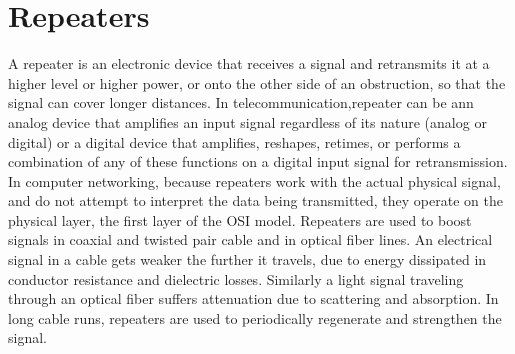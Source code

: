 \section{Repeaters}
A repeater is an electronic device that receives a signal and retransmits it at a higher level or higher power, or onto the other side of an obstruction, so that the signal can cover longer distances.
In telecommunication,repeater can be ann analog device that amplifies an input signal regardless of its nature (analog or digital) or a digital device that amplifies, reshapes, retimes, or performs a combination of any of these functions on a digital input signal for retransmission.
In computer networking, because repeaters work with the actual physical signal, and do not attempt to interpret the data being transmitted, they operate on the physical layer, the first layer of the OSI model.
Repeaters are used to boost signals in coaxial and twisted pair cable and in optical fiber lines. An electrical signal in a cable gets weaker the further it travels, due to energy dissipated in conductor resistance and dielectric losses. Similarly a light signal traveling through an optical fiber suffers attenuation due to scattering and absorption. In long cable runs, repeaters are used to periodically regenerate and strengthen the signal.